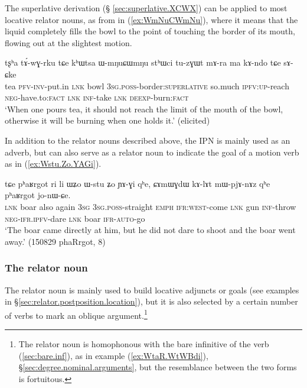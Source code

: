 The superlative derivation (§ \ref{sec:superlative.XCWX}) can be applied to most locative relator nouns, as  from   in (\ref{ex:WmNuCWmNu}), where it means that the liquid completely fills the bowl to the point of touching the border of its mouth, flowing out at the slightest motion.

\begin{exe}
\ex \label{ex:WmNuCWmNu}
\gll  tʂʰa tɤ́-wɣ-rku tɕe kʰɯtsa ɯ-mŋuɕɯmŋu stʰɯci tu-zɣɯt mɤ-ra ma kɤ-ndo tɕe sɤ-ɕke \\
tea \textsc{pfv}-\textsc{inv}-put.in \textsc{lnk} bowl \textsc{3sg}.\textsc{poss}-border:\textsc{superlative} so.much \textsc{ipfv}:\textsc{up}-reach \textsc{neg}-have.to:\textsc{fact} \textsc{lnk} \textsc{inf}-take \textsc{lnk} \textsc{deexp}-burn:\textsc{fact} \\
\glt `When one pours tea, it should not reach the limit of the mouth of the bowl, otherwise it will be burning when one holds it.' (elicited)
\end{exe} 

In addition to the relator nouns described above, the IPN  is mainly used as an adverb, but can also serve as a relator noun to indicate the goal of a motion verb as in (\ref{ex:Wstu.Zo.YAGi}).

\begin{exe}
\ex \label{ex:Wstu.Zo.YAGi}
\gll  tɕe pʰaʁrgot ri li ɯʑo ɯ-stu ʑo ɲɤ-ɣi qʰe,  ɕɤmɯɣdɯ kɤ-lɤt mɯ-pjɤ-nɤz qʰe pʰaʁrgot jo-nɯ-ɕe. \\
\textsc{lnk} boar also again \textsc{3sg} \textsc{3sg}.\textsc{poss}-straight \textsc{emph} \textsc{ifr}:\textsc{west}-come \textsc{lnk} gun \textsc{inf}-throw \textsc{neg}-\textsc{ifr}.\textsc{ipfv}-dare \textsc{lnk} boar \textsc{ifr}-\textsc{auto}-go \\
\glt `The boar came directly at him, but he did not dare to shoot and the boar went away.' (150829 phaRrgot, 8)
\end{exe} 

\subsubsection{The relator noun } \label{sec:WtaR}
The relator noun  is mainly used to build locative adjuncts or goals (see examples in §\ref{sec:relator.postposition.location}), but it is also selected by a certain number of verbs to mark an oblique argument.\footnote{The relator noun  is homophonous with the bare infinitive  of the verb  (\ref{sec:bare.inf}), as in example (\ref{ex:WtaR.WtWBdi}), §\ref{sec:degree.nominal.arguments}, but the resemblance between the two forms is fortuitous. }

